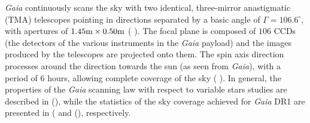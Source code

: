 \textit{Gaia} continuously scans the sky with two identical, three-mirror anastigmatic (TMA) telescopes pointing in directions separated by a basic angle of $\Gamma = 106.6^\circ$, with apertures of $1.45\textnormal{m}\times0.50\textnormal{m}$ ( \citeyear{2016A&A...595A...1G}). The focal plane is composed of $106$ CCDs (the detectors of the various instruments in the \textit{Gaia} payload) and the images produced by the telescopes are projected onto them. The spin axis direction processes around the direction towards the sun (as seen from \textit{Gaia}), with a period of $6$ hours, allowing complete coverage of the sky ( \citeyear{2016A&A...595A...2G}). In general, the properties of the \textit{Gaia} scanning law with respect to variable stars studies are described in  (\citeyear{2017arXiv170203295E}), while the statistics of the sky coverage achieved for \textit{Gaia} DR1 are presented in  (\citeyear{2016A&A...595A...4L} and  (\citeyear{2017A&A...599A..32V}), respectively.\\

